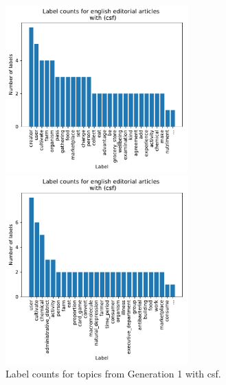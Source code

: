 {\begin{figure}
	\begin{minipage}[t]{0.5\textwidth}
		\includegraphics[width=7cm]{gfx/ATL_sim/with_scoring_pre.pdf}
	\end{minipage}
	\begin{minipage}[t]{0.5\textwidth}
		\includegraphics[width=7cm]{gfx/ATL_sim/with_scoring.pdf}
	\end{minipage}
	\caption{Label counts for topics from Generation 1 with csf.}
\end{figure}

}
